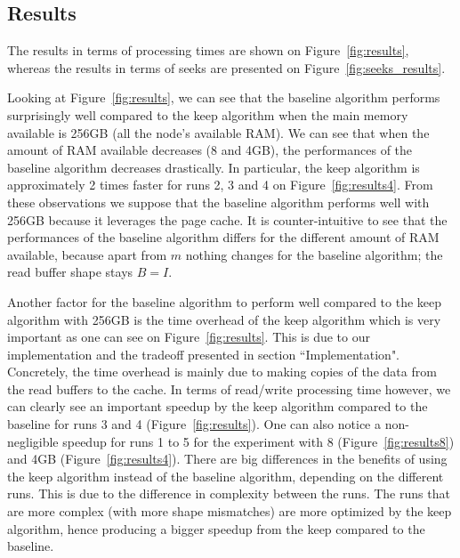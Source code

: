\documentclass[sigconf, nonacm]{acmart}
\begin{document}
{\begin{table}[ht]
   \label{tab:buffer_shapes}

\end{table}

\subsection{Results}

The results in terms of processing times are shown on
Figure~\ref{fig:results}, whereas the results in terms of seeks are
presented on Figure~\ref{fig:seeks_results}.

Looking at Figure~\ref{fig:results}, we can see that
the baseline algorithm performs surprisingly well compared to the keep algorithm
when the main memory available is 256GB (all the node's available RAM).
We can see that when the amount of RAM available decreases (8 and 4GB), the
performances of the baseline algorithm decreases drastically.
In particular, the keep algorithm is approximately 2 times faster for runs
2, 3 and 4 on Figure~\ref{fig:results4}.
From these observations we suppose that the baseline algorithm performs well
with 256GB because it leverages the page cache.
It is counter-intuitive to see that the performances of the baseline algorithm
differs for the different amount of RAM available, because apart from $m$
nothing changes for the baseline algorithm; the read buffer shape stays $B=I$.

Another factor for the baseline algorithm to perform well compared to the
keep algorithm with 256GB is the time overhead of the keep algorithm which is
very important as one can see on Figure~\ref{fig:results}.
This is due to our implementation and the tradeoff presented in section
``Implementation".
Concretely, the time overhead is mainly due to making copies of the data from
the read buffers to the cache.
In terms of read/write processing time however, we can clearly see an
important speedup by the keep algorithm compared to the baseline for
runs 3 and 4 (Figure~\ref{fig:results}).
One can also notice a non-negligible speedup for runs 1 to 5 for the experiment
with 8 (Figure~\ref{fig:results8}) and 4GB (Figure~\ref{fig:results4}).
There are big differences in the benefits of using the keep algorithm instead of
the baseline algorithm, depending on the different runs.
This is due to the difference in complexity between the runs.
The runs that are more complex (with more shape mismatches) are more optimized
by the keep algorithm, hence producing a bigger speedup from the keep compared to
the baseline.

}
\end{document}

